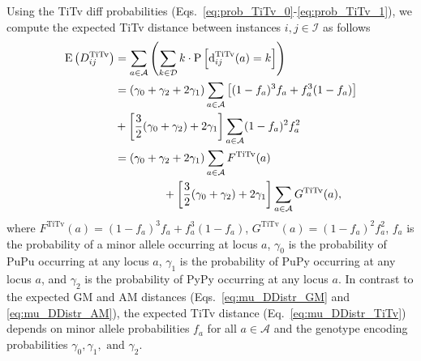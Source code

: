 \documentclass[aos]{imsart}
\begin{document}
Using the TiTv diff probabilities (Eqs.~\ref{eq:prob_TiTv_0}-\ref{eq:prob_TiTv_1}), we compute the expected TiTv distance between instances $i,j \in \mathcal{I}$ as follows
%
\begin{equation}\label{eq:mu_DDistr_TiTv}
\begin{aligned}
\text{E}\left(D^\text{TiTv}_{ij}\right) &= \sum_{a \in \mathcal{A}} \left(\sum_{k \in \mathcal{D}} k \cdot \text{P}\left[\text{d}^\text{TiTv}_{ij}(a) = k\right]\right) \\
&= (\gamma_0 + \gamma_2 + 2\gamma_1) \sum_{a \in \mathcal{A}} \left[(1 - f_a)^3 f_a + f^3_a (1 - f_a)\right] \\
&+ \left[\frac{3}{2}(\gamma_0 + \gamma_2) + 2\gamma_1\right] \sum_{a \in \mathcal{A}} (1 - f_a)^2 f^2_a \\
&= (\gamma_0 + \gamma_2 + 2\gamma_1) \sum_{a \in \mathcal{A}} F^\text{TiTv}(a)\\
&\hspace{1.5cm} + \left[\frac{3}{2}(\gamma_0 + \gamma_2) + 2\gamma_1\right] \sum_{a \in \mathcal{A}} G^\text{TiTv}(a),
\end{aligned}
\end{equation}
%
where $F^\text{TiTv}(a) = (1 - f_a)^3 f_a + f^3_a (1 - f_a)$, $G^\text{TiTv}(a) = (1 - f_a)^2 f^2_a$, $f_a$ is the probability of a minor allele occurring at locus $a$, $\gamma_0$ is the probability of PuPu occurring at any locus $a$, $\gamma_1$ is the probability of PuPy occurring at any locus $a$, and $\gamma_2$ is the probability of PyPy occurring at any locus $a$. In contrast to the expected GM and AM distances (Eqs.~\ref{eq:mu_DDistr_GM} and \ref{eq:mu_DDistr_AM}), the expected TiTv distance (Eq.~\ref{eq:mu_DDistr_TiTv}) depends on minor allele probabilities $f_a$ for all $a \in \mathcal{A}$ and the genotype encoding probabilities $\gamma_0, \gamma_1, \text{ and } \gamma_2$. 
\end{document}
